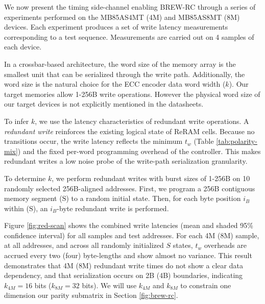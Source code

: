 \label{sec:prelim-expts}

We now present the timing side-channel enabling BREW-RC through a series of experiments performed on the MB85AS4MT (4M) and MB85AS8MT (8M) devices. 
Each experiment produces a set of write latency measurements corresponding to a test sequence. Measurements are carried out on 4 samples of each device.

\label{sec:red}
\label{exp:i}

% 


In a crossbar-based architecture, the word size of the memory array is the smallest unit that can be serialized through the write path. Additionally, the word size is the natural choice for the ECC encoder data word width ($k$). Our target memories allow 1-256B write operations. However the physical word size of our target devices is not explicitly mentioned in the datasheets.

To infer $k$, we use the latency characteristics of redundant write operations. A \textit{redundant write} reinforces the existing logical state of ReRAM cells.  Because no transitions occur, the write latency reflects the minimum $t_{w}$ (Table \ref{tab:polarity-mix}) and the fixed per-word programming overhead of the controller. This makes redundant writes a low noise probe of the write-path serialization granularity. 

To determine $k$, we perform redundant writes with burst sizes of 1-256B on 10 randomly selected 256B-aligned addresses. First, we program a 256B contiguous memory segment ($\mathrm{S}$) to a random initial state. Then, for each byte position $i_B$ within ($\mathrm{S}$), an $i_B$-byte redundant write is performed.

Figure \ref{fig:red-scan} shows the combined write latencies (mean and shaded 95\% confidence interval) for all samples and test addresses. For each 4M (8M) sample, at all addresses, and across all randomly initialized $S$ states, $t_w$ overheads are accrued every two (four) byte-lengths and show almost no variance. This result demonstrates that 4M (8M) redundant write times do not show a clear data dependency, and that serialization occurs on 2B (4B) boundaries, indicating $k_{4M}=16$ bits ($k_{8M}=32$ bits). We will use $k_{4M}$ and $k_{8M}$ to constrain one dimension our parity submatrix in Section \ref{fig:brew-rc}.

